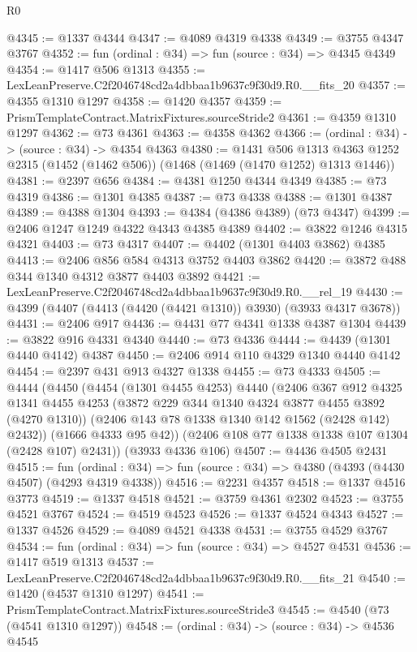 \begin{lexlean}{R0}
\begin{coremodule}
@4345 := @1337 @4344
@4347 := @4089 @4319 @4338
@4349 := @3755 @4347 @3767
@4352 := fun (ordinal : @34) => fun (source : @34) => @4345 @4349
@4354 := @1417 @506 @1313
@4355 := LexLeanPreserve.C2f2046748cd2a4dbbaa1b9637c9f30d9.R0.__fits_20
@4357 := @4355 @1310 @1297
@4358 := @1420 @4357
@4359 := PrismTemplateContract.MatrixFixtures.sourceStride2
@4361 := @4359 @1310 @1297
@4362 := @73 @4361
@4363 := @4358 @4362
@4366 := (ordinal : @34) -> (source : @34) -> @4354 @4363
@4380 := @1431
    @506
    @1313
    @4363
    @1252
    @2315
    (@1452 (@1462 @506))
    (@1468 (@1469 (@1470 @1252) @1313 @1446))
@4381 := @2397 @656
@4384 := @4381 @1250 @4344 @4349
@4385 := @73 @4319
@4386 := @1301 @4385
@4387 := @73 @4338
@4388 := @1301 @4387
@4389 := @4388 @1304
@4393 := @4384 (@4386 @4389) (@73 @4347)
@4399 := @2406 @1247 @1249 @4322 @4343 @4385 @4389
@4402 := @3822 @1246 @4315 @4321
@4403 := @73 @4317
@4407 := @4402 (@1301 @4403 @3862) @4385
@4413 := @2406 @856 @584 @4313 @3752 @4403 @3862
@4420 := @3872 @488 @344 @1340 @4312 @3877 @4403 @3892
@4421 := LexLeanPreserve.C2f2046748cd2a4dbbaa1b9637c9f30d9.R0.__rel_19
@4430 := @4399 (@4407 (@4413 (@4420 (@4421 @1310)) @3930) (@3933 @4317 @3678))
@4431 := @2406 @917
@4436 := @4431 @77 @4341 @1338 @4387 @1304
@4439 := @3822 @916 @4331 @4340
@4440 := @73 @4336
@4444 := @4439 (@1301 @4440 @4142) @4387
@4450 := @2406 @914 @110 @4329 @1340 @4440 @4142
@4454 := @2397 @431 @913 @4327 @1338
@4455 := @73 @4333
@4505 := @4444
    (@4450
      (@4454
        (@1301 @4455 @4253)
        @4440
        (@2406
          @367
          @912
          @4325
          @1341
          @4455
          @4253
          (@3872 @229 @344 @1340 @4324 @3877 @4455 @3892 (@4270 @1310))
          (@2406 @143 @78 @1338 @1340 @142 @1562 (@2428 @142) @2432))
        (@1666 @4333 @95 @42))
      (@2406 @108 @77 @1338 @1338 @107 @1304 (@2428 @107) @2431))
    (@3933 @4336 @106)
@4507 := @4436 @4505 @2431
@4515 := fun (ordinal : @34) =>
  fun (source : @34) => @4380 (@4393 (@4430 @4507) (@4293 @4319 @4338))
@4516 := @2231 @4357
@4518 := @1337 @4516 @3773
@4519 := @1337 @4518
@4521 := @3759 @4361 @2302
@4523 := @3755 @4521 @3767
@4524 := @4519 @4523
@4526 := @1337 @4524 @4343
@4527 := @1337 @4526
@4529 := @4089 @4521 @4338
@4531 := @3755 @4529 @3767
@4534 := fun (ordinal : @34) => fun (source : @34) => @4527 @4531
@4536 := @1417 @519 @1313
@4537 := LexLeanPreserve.C2f2046748cd2a4dbbaa1b9637c9f30d9.R0.__fits_21
@4540 := @1420 (@4537 @1310 @1297)
@4541 := PrismTemplateContract.MatrixFixtures.sourceStride3
@4545 := @4540 (@73 (@4541 @1310 @1297))
@4548 := (ordinal : @34) -> (source : @34) -> @4536 @4545

\end{coremodule}
\end{lexlean}
